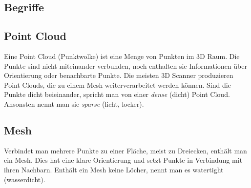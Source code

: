 \documentclass{paper}
\begin{document}
	
	\begin{appendix}
		\section{Begriffe}
			\subsection{Point Cloud}\label{app:point_cloud}
				Eine Point Cloud (Punktwolke) ist eine Menge von Punkten im 3D Raum. Die Punkte sind nicht miteinander verbunden, noch enthalten sie Informationen über Orientierung oder benachbarte Punkte. Die meisten 3D Scanner produzieren Point Clouds, die zu einem Mesh weiterverarbeitet werden können.
				Sind die Punkte dicht beieinander, spricht man von einer \emph{dense} (dicht) Point Cloud. Ansonsten nennt man sie \emph{sparse} (licht, locker).
			
			\subsection{Mesh}\label{app:mesh}
				Verbindet man mehrere Punkte zu einer Fläche, meist zu Dreiecken, enthält man ein Mesh. Dies hat eine klare Orientierung und setzt Punkte in Verbindung mit ihren Nachbarn. Enthält ein Mesh keine Löcher, nennt man es watertight (wasserdicht).
			
	\end{appendix}
	
	
%	
	
%	
	\nocite{*}
	
\end{document}
